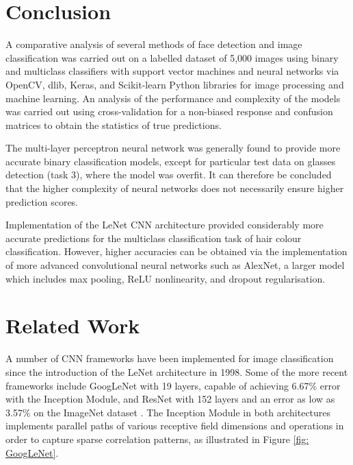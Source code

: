 \documentclass[conference]{IEEEtran}
\begin{document}
\section{Conclusion} \label{s-concl}


A comparative analysis of several methods of face detection and image classification was carried out on a labelled dataset of 5,000 images using binary and multiclass classifiers with support vector machines and neural networks via OpenCV, dlib, Keras, and Scikit-learn Python libraries for image processing and machine learning. An analysis of the performance and complexity of the models was carried out using cross-validation for a non-biased response and confusion matrices to obtain the statistics of true predictions. 

The multi-layer perceptron neural network was generally found to provide more accurate binary classification models, except for particular test data on glasses detection (task 3), where the model was overfit. It can therefore be concluded that the higher complexity of neural networks does not necessarily ensure higher prediction scores.

Implementation of the LeNet CNN architecture provided considerably more accurate predictions for the multiclass classification task of hair colour classification. However, higher accuracies can be obtained via the implementation of more advanced convolutional neural networks such as AlexNet, a larger model which includes max pooling, ReLU nonlinearity, and dropout regularisation.

\section{Related Work} \label{s-rel-work}


A number of CNN frameworks have been implemented for image classification since the introduction of the LeNet architecture in 1998. Some of the more recent frameworks include GoogLeNet with 19 layers, capable of achieving 6.67\% error with the Inception Module,
and ResNet with 152 layers and an error as low as 3.57\% on the ImageNet dataset \cite{He2006}. The Inception Module in both architectures implements parallel paths of various receptive field dimensions and operations in order to capture sparse correlation patterns, as illustrated in Figure \ref{fig: GoogLeNet}.
\end{document}
